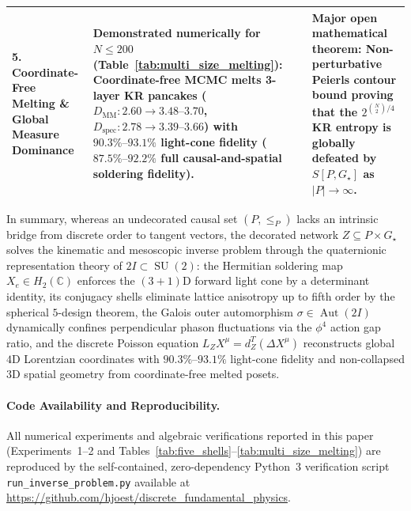 \documentclass[11pt,a4paper]{article}
\theoremstyle{definition}
\theoremstyle{remark}
\newcommand{\C}{\mathbb{C}}
\newcommand{\SU}{\operatorname{SU}}
\newcommand{\Gstar}{G_\star}
\begin{document}
\begin{table}[!htbp]
{\begin{tabular}{@{}l>{\raggedright\arraybackslash}p{7.2cm}>{\raggedright\arraybackslash}p{5.8cm}@{}}
\addlinespace
\textbf{5. Coordinate-Free Melting \& Global Measure Dominance} & \textbf{Demonstrated numerically for $N \le 200$ (Table~\ref{tab:multi_size_melting}):} Coordinate-free MCMC melts 3-layer KR pancakes ($D_{\mathrm{MM}}: 2.60 \to 3.48\text{--}3.70$, $D_{\mathrm{spec}}: 2.78 \to 3.39\text{--}3.66$) with $90.3\%\text{--}93.1\%$ light-cone fidelity ($87.5\%\text{--}92.2\%$ full causal-and-spatial soldering fidelity). & \textbf{Major open mathematical theorem:} Non-perturbative Peierls contour bound proving that the $2^{\binom{N}{2}/4}$ KR entropy is globally defeated by $S[P, \Gstar]$ as $|P| \to \infty$. \\
\bottomrule
\end{tabular}%
}
\end{table}

In summary, whereas an undecorated causal set $(P, \le_P)$ lacks an intrinsic bridge from discrete order to tangent vectors, the decorated network $Z \subseteq P \times \Gstar$ solves the kinematic and mesoscopic inverse problem through the quaternionic representation theory of $2I \subset \SU(2)$: the Hermitian soldering map $X_e \in H_2(\C)$ enforces the $(3+1)\text{D}$ forward light cone by a determinant identity, its conjugacy shells eliminate lattice anisotropy up to fifth order by the spherical $5$-design theorem, the Galois outer automorphism $\sigma \in \operatorname{Aut}(2I)$ dynamically confines perpendicular phason fluctuations via the $\phi^4$ action gap ratio, and the discrete Poisson equation $L_Z X^\mu = d_Z^T(\Delta X^\mu)$ reconstructs global $4\text{D}$ Lorentzian coordinates with $90.3\%\text{--}93.1\%$ light-cone fidelity and non-collapsed $3\text{D}$ spatial geometry from coordinate-free melted posets.

\paragraph{Code Availability and Reproducibility.}
All numerical experiments and algebraic verifications reported in this paper (Experiments~1--2 and Tables~\ref{tab:five_shells}--\ref{tab:multi_size_melting}) are reproduced by the self-contained, zero-dependency Python~3 verification script \texttt{run\_inverse\_problem.py} available at \url{https://github.com/hjoest/discrete_fundamental_physics}.

\clearpage
\end{document}
